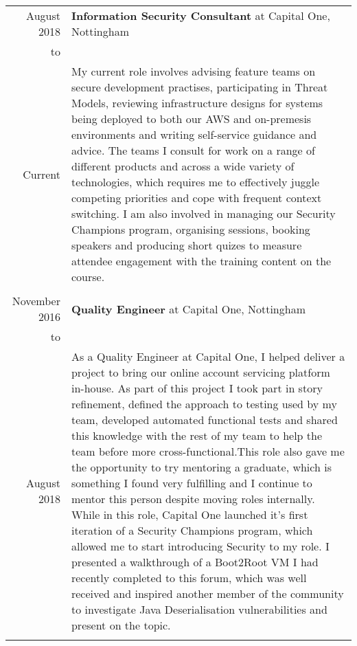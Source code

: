 \documentclass[a4paper,10pt]{article} %
\begin{document}
\begin{longtable}{r|p{16cm}}

August 2018 & \textbf{Information Security Consultant} at Capital One, Nottingham \\
to & \\
Current & My current role involves advising feature teams on secure development practises, participating in Threat Models, reviewing infrastructure designs for systems being deployed to both our AWS and on-premesis environments and writing self-service guidance and advice. The teams I consult for work on a range of different products and across a wide variety of technologies, which requires me  to effectively juggle competing priorities and cope with frequent context switching. I am also involved in managing our Security Champions program, organising sessions, booking speakers and producing short quizes to measure attendee engagement with the training content on the course.\\
\multicolumn{2}{c}{} \\

November 2016 & \textbf{Quality Engineer} at Capital One, Nottingham \\
to & \\
August 2018 & As a Quality Engineer at Capital One, I helped deliver a project to bring our online account servicing platform in-house. As part of this project I took part in story refinement, defined the approach to testing used by my team, developed automated functional tests and shared this knowledge with the rest of my team to help the team before more cross-functional.This role also gave me the opportunity to try mentoring a graduate, which is something I found very fulfilling and I continue to mentor this person despite moving roles internally. While in this role, Capital One launched it's first iteration of a Security Champions program, which allowed me to start introducing Security to my role. I presented a walkthrough of a Boot2Root VM I had recently completed to this forum, which was well received and inspired another member of the community to investigate Java Deserialisation vulnerabilities and present on the topic.\\
\multicolumn{2}{c}{} \\


\end{longtable}
\end{document}
